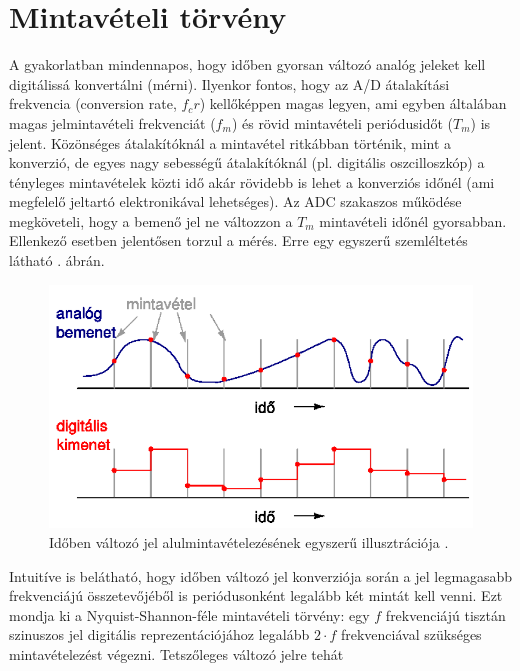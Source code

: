 \documentclass[12pt]{article}
\theoremstyle{plain}
\begin{document}
\section{Mintavételi törvény}

A gyakorlatban mindennapos, hogy időben gyorsan változó analóg jeleket kell digitálissá konvertálni (mérni). Ilyenkor fontos, hogy az A/D átalakítási frekvencia (conversion rate, $f_cr$) kellőképpen magas legyen, ami egyben általában magas jelmintavételi frekvenciát ($f_m$) és rövid mintavételi periódusidőt ($T_m$) is jelent. Közönséges átalakítóknál a mintavétel ritkábban történik, mint a konverzió, de egyes nagy sebességű átalakítóknál (pl. digitális oszcilloszkóp) a tényleges mintavételek közti idő akár rövidebb is lehet a konverziós időnél (ami megfelelő jeltartó elektronikával lehetséges).
Az ADC szakaszos működése megköveteli, hogy a bemenő jel ne változzon a $T_m$ mintavételi időnél gyorsabban. Ellenkező esetben jelentősen torzul a mérés. Erre egy egyszerű szemléltetés látható . ábrán.


\begin{figure}
	\centering
	\includegraphics[width=0.7\linewidth]{media/mintavetel_intuitiv}
	\caption{Időben változó jel alulmintavételezésének egyszerű illusztrációja \cite{Bagoly}.}
	\label{fig:mintavetelintuitiv}
\end{figure}


Intuitíve is belátható, hogy időben változó jel konverziója során a jel legmagasabb frekvenciájú összetevőjéből is periódusonként legalább két mintát kell venni. Ezt mondja ki a Nyquist-Shannon-féle mintavételi törvény: egy $f$ frekvenciájú
tisztán szinuszos jel digitális reprezentációjához legalább $2 \cdot f$ frekvenciával szükséges mintavételezést végezni. Tetszőleges változó jelre tehát
\end{document}
